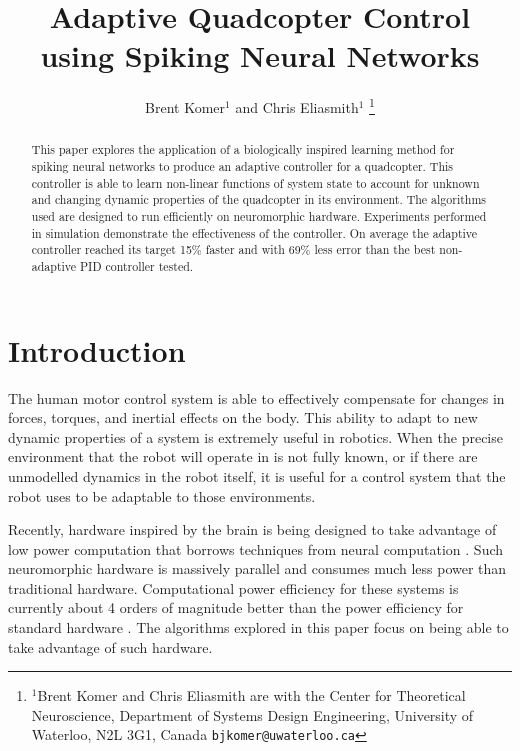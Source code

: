 \documentclass[letterpaper, 10 pt, conference]{ieeeconf}  %
\title{\LARGE \bf
Adaptive Quadcopter Control using Spiking Neural Networks
}
\author{Brent Komer$^{1}$ and Chris Eliasmith$^{1}$%
\thanks{$^{1}$Brent Komer and Chris Eliasmith are with the Center for Theoretical Neuroscience, Department of Systems Design Engineering,
        University of Waterloo, N2L 3G1, Canada
        {\tt\small bjkomer@uwaterloo.ca}}%
}
\begin{document}
\maketitle
\thispagestyle{empty}
\pagestyle{empty}


\begin{abstract}

This paper explores the application of a biologically inspired learning method for spiking neural networks to produce an adaptive controller for a quadcopter.
This controller is able to learn non-linear functions of system state to account for unknown and changing dynamic properties of the quadcopter in its environment.
The algorithms used are designed to run efficiently on neuromorphic hardware.
Experiments performed in simulation demonstrate the effectiveness of the controller.
On average the adaptive controller reached its target 15\% faster and with 69\% less error than the best non-adaptive PID controller tested.

\end{abstract}


\section{Introduction}

The human motor control system is able to effectively compensate for changes in forces, torques, and inertial effects on the body.
This ability to adapt to new dynamic properties of a system is extremely useful in robotics.
When the precise environment that the robot will operate in is not fully known, or if there are unmodelled dynamics in the robot itself, it is useful for a control system that the robot uses to be adaptable to those environments.

Recently, hardware inspired by the brain is being designed to take advantage of low power computation that borrows techniques from neural computation \cite{hasler2013finding, khan2008spinnaker, boahen2006neurogrid}.
Such neuromorphic hardware is massively parallel and consumes much less power than traditional hardware.
Computational power efficiency for these systems is currently about 4 orders of magnitude better than the power efficiency for standard hardware \cite{hasler2013finding}.
The algorithms explored in this paper focus on being able to take advantage of such hardware.
\end{document}
